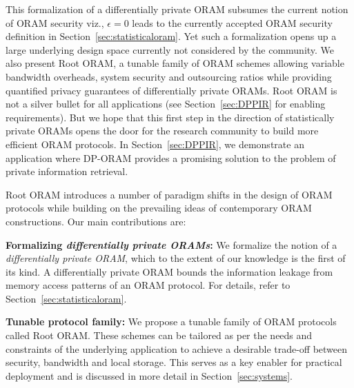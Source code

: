 \documentclass[USenglish,oneside,twocolumn]{article}
\makeatletter
\newcommand{\ourprotocol}{Root ORAM}
\let\origsubsection\subsection
\renewcommand\subsection{\@ifstar{\starsubsection}{\nostarsubsection}}
\newcommand\nostarsubsection[1]
{\subsectionprelude\origsubsection{#1}\subsectionpostlude}
\newcommand\starsubsection[1]
{\subsectionprelude\origsubsection*{#1}\subsectionpostlude}
\newcommand\subsectionprelude{\vspace{-1.5em}}
\newcommand\subsectionpostlude{\vspace{-1em}}
\makeatother
\begin{document}
This formalization of a differentially private ORAM subsumes the current notion of ORAM security viz., $\epsilon = 0$ leads to the currently accepted ORAM security definition in Section~\ref{sec:statisticaloram}. Yet such a formalization opens up a large underlying design space currently not considered by the community. We also present \ourprotocol{}, a tunable family of ORAM schemes allowing variable bandwidth overheads, 
system security and outsourcing ratios while providing quantified privacy guarantees of differentially private ORAMs. \ourprotocol{} is not a silver bullet for all applications (see Section~\ref{sec:DPPIR} for enabling requirements). But we hope that this first step in the direction of statistically private ORAMs opens the door for the research community to build more efficient ORAM protocols. In Section~\ref{sec:DPPIR}, we demonstrate an application where DP-ORAM provides a promising solution to the problem of private information retrieval.


\subsection{Our Contributions}
\ourprotocol{} introduces a number of paradigm shifts in the design of ORAM protocols while 
building on the prevailing ideas of contemporary ORAM constructions. Our main contributions are: 


\textbf{Formalizing \emph{differentially private ORAMs}: }We formalize the notion of a 
\emph{differentially private ORAM}, which to the extent of our knowledge is 
the first of its kind. A differentially private ORAM bounds the information 
leakage from memory access patterns of an ORAM protocol. 
For details, refer to Section~\ref{sec:statisticaloram}.

\textbf{Tunable protocol family: }We propose a tunable family of ORAM protocols called \ourprotocol{}. These schemes can be tailored as per the needs and 
constraints of the underlying application to achieve a desirable trade-off between security, bandwidth and local storage. This serves as a key enabler for practical deployment 
and is discussed in more detail in Section~\ref{sec:systems}.
\end{document}
